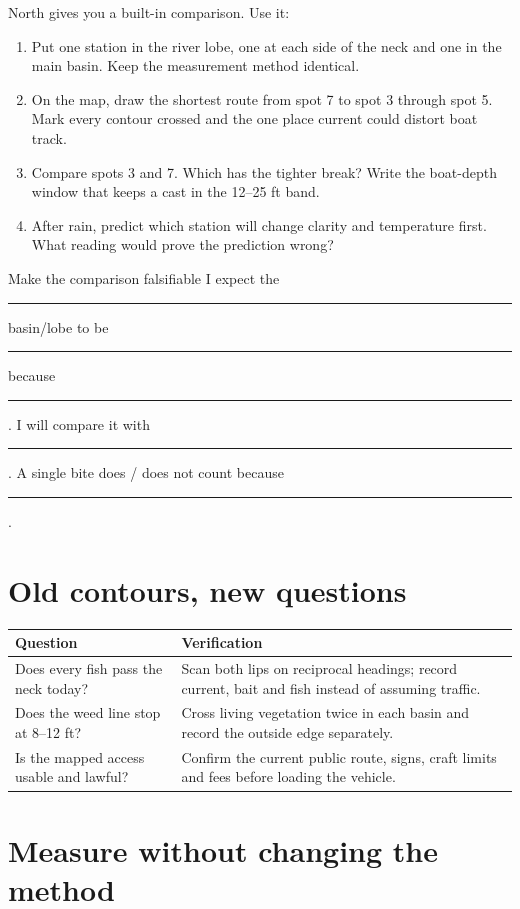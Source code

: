 North gives you a built-in comparison. Use it:
\begin{enumerate}
\item Put one station in the river lobe, one at each side of the neck and one
in the main basin. Keep the measurement method identical.
\item On the map, draw the shortest route from spot 7 to spot 3 through spot 5.
Mark every contour crossed and the one place current could distort boat track.
\item Compare spots 3 and 7. Which has the tighter break? Write the boat-depth
window that keeps a cast in the 12--25 ft band.
\item After rain, predict which station will change clarity and temperature
first. What reading would prove the prediction wrong?
\end{enumerate}

\begin{teloscard}{Make the comparison falsifiable}
I expect the \rule{1.25in}{.4pt} basin/lobe to be \rule{1.5in}{.4pt} because
\rule{2.15in}{.4pt}. I will compare it with \rule{1.8in}{.4pt}. A single bite
does / does not count because \rule{1.75in}{.4pt}.
\end{teloscard}

\section{Old contours, new questions}
\begin{tabularx}{\linewidth}{@{}p{.31\linewidth}X@{}}
\toprule
\textbf{Question} & \textbf{Verification}\\
\midrule
Does every fish pass the neck today? & Scan both lips on reciprocal headings;
record current, bait and fish instead of assuming traffic.\\
Does the weed line stop at 8--12 ft? & Cross living vegetation twice in each
basin and record the outside edge separately.\\
Is the mapped access usable and lawful? & Confirm the current public route,
signs, craft limits and fees before loading the vehicle.\\
\bottomrule
\end{tabularx}

\newpage
\section{Measure without changing the method}

